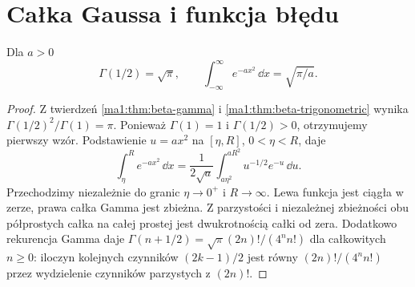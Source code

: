 \section{Całka Gaussa i funkcja błędu}
\begin{twierdzenie}
\label{ma1:thm:gaussian-integral}
Dla $a>0$
\[
 \Gamma(1/2)=\sqrt{\pi},\qquad
 \int_{-\infty}^\infty e^{-ax^2}\,\dd x=\sqrt{\pi/a}.
\]
\end{twierdzenie}
\begin{proof}
Z twierdzeń \ref{ma1:thm:beta-gamma} i \ref{ma1:thm:beta-trigonometric} wynika $\Gamma(1/2)^2/\Gamma(1)=\pi$. Ponieważ $\Gamma(1)=1$ i $\Gamma(1/2)>0$, otrzymujemy pierwszy wzór. Podstawienie $u=ax^2$ na $[\eta,R]$, $0<\eta<R$, daje
\[
 \int_\eta^R e^{-ax^2}\,\dd x
 =\frac{1}{2\sqrt a}\int_{a\eta^2}^{aR^2}u^{-1/2}e^{-u}\,\dd u.
\]
Przechodzimy niezależnie do granic $\eta\to0^+$ i $R\to\infty$. Lewa funkcja jest ciągła w zerze, prawa całka Gamma jest zbieżna. Z parzystości i niezależnej zbieżności obu półprostych całka na całej prostej jest dwukrotnością całki od zera. Dodatkowo rekurencja Gamma daje $\Gamma(n+1/2)=\sqrt\pi(2n)!/(4^n n!)$ dla całkowitych $n\ge0$: iloczyn kolejnych czynników $(2k-1)/2$ jest równy $(2n)!/(4^n n!)$ przez wydzielenie czynników parzystych z $(2n)!$.
\end{proof}

